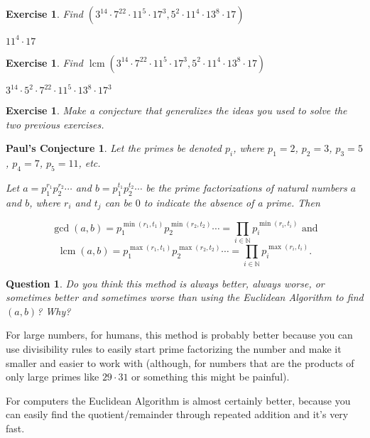 \documentclass{article}
\DeclareMathOperator{\lcm}{lcm}
\newtheorem{ques}[thm]{Question}
\newtheorem{ex}[thm]{Exercise}
\newtheorem{PC}{Paul's Conjecture}
\numberwithin{equation}{thm}
\begin{document}
\begin{ex} \label{2.14}
  Find $(3^14 \cdot 7^22 \cdot 11^5 \cdot 17^3, 5^2 \cdot 11^4 \cdot 13^8 \cdot 17)$
\end{ex}

$11^4 \cdot 17$



\begin{ex} \label{2.15}
  Find $\lcm (3^14 \cdot 7^22 \cdot 11^5 \cdot 17^3, 5^2 \cdot 11^4 \cdot 13^8 \cdot 17)$
\end{ex}

$3^14 \cdot 5^2 \cdot 7^22 \cdot 11^5 \cdot 13^8 \cdot 17^3$



\begin{ex} \label{2.16}
  Make a conjecture that generalizes the ideas you used to solve the two previous exercises.
\end{ex}

\begin{PC} \label{PC 2.16}
  Let the primes be denoted $p_i$, where $p_1 = 2$, $p_2 = 3$, $p_3 = 5$, $p_4 = 7$, $p_5 = 11$, etc.

  Let $a = p_1^{r_1} p_2^{r_2} \cdots$ and $b = p_1^{t_1} p_2^{t_2} \cdots$ be the prime factorizations of natural numbers $a$ and $b$, where $r_i$ and $t_j$ can be $0$ to indicate the absence of a prime. Then

  $$\gcd (a, b) = p_1^{\min(r_1, t_1)} p_2^{\min(r_2, t_2)} \cdots = \prod_{i \in \mathbb{N}} p_i^{\min(r_i, t_i)} \mbox{ and}$$
  $$\lcm (a, b) = p_1^{\max(r_1, t_1)} p_2^{\max(r_2, t_2)} \cdots = \prod_{i \in \mathbb{N}} p_i^{\max(r_i, t_i)}.$$
\end{PC}



\begin{ques} \label{2.17}
  Do you think this method is always better, always worse, or sometimes better and sometimes worse than using the Euclidean Algorithm to find $(a,b)$? Why?
\end{ques}

For large numbers, for humans, this method is probably better because you can use divisibility rules to easily start prime factorizing the number and make it smaller and easier to work with (although, for numbers that are the products of only large primes like $29 \cdot 31$ or something this might be painful).

For computers the Euclidean Algorithm is almost certainly better, because you can easily find the quotient/remainder through repeated addition and it's very fast.
\end{document}

